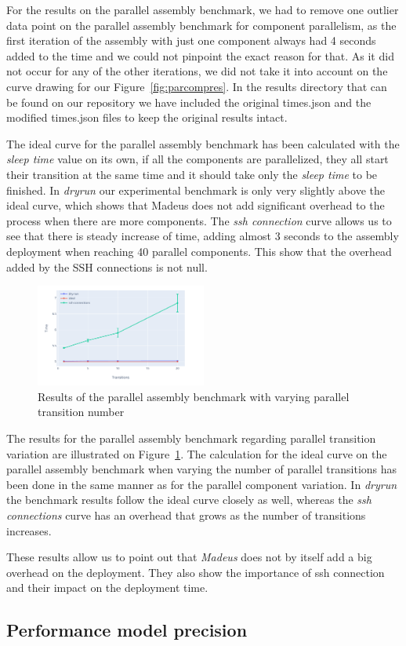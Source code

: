 For the results on the parallel assembly benchmark, we had to remove one outlier data point on the parallel assembly benchmark for component parallelism, as the first iteration of the assembly with just one component always had 4 seconds added to the time and we could not pinpoint the exact reason for that. As it did not occur for any of the other iterations, we did not take it into account on the curve drawing for our Figure~\ref{fig:parcompres}. In the results directory that can be found on our repository we have included the original times.json and the modified times.json files to keep the original results intact.

The ideal curve for the parallel assembly benchmark has been calculated with the \emph{sleep time} value on its own, if all the components are parallelized, they all start their transition at the same time and it should take only the \emph{sleep time} to be finished. In \emph{dryrun} our experimental benchmark is only very slightly above the ideal curve, which shows that Madeus does not add significant overhead to the process when there are more components. The \emph{ssh connection} curve allows us to see that there is steady increase of time, adding almost 3 seconds to the assembly deployment when reaching 40 parallel components. This show that the overhead added by the SSH connections is not null.

\begin{figure}[h]
  \begin{center} 
    \includegraphics[width=0.5\textwidth]{./images/evaluations_par_transitions.pdf}
    \caption{Results of the parallel assembly benchmark with varying parallel transition number}
    \label{fig:partrans}
  \end{center}
\end{figure}

The results for the parallel assembly benchmark regarding parallel transition variation are illustrated on Figure~\ref{fig:partrans}. The calculation for the ideal curve on the parallel assembly benchmark when varying the number of parallel transitions has been done in the same manner as for the parallel component variation. In \emph{dryrun} the benchmark results follow the ideal curve closely as well, whereas the \emph{ssh connections} curve has an overhead that grows as the number of transitions increases.

These results allow us to point out that \emph{Madeus} does not by itself add a big overhead on the deployment. They also show the importance of ssh connection and their impact on the deployment time.

\subsection{Performance model precision}


